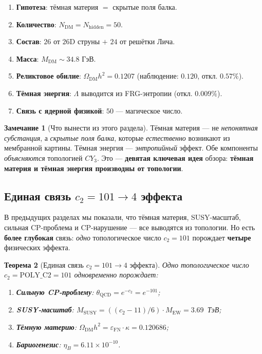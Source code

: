 \documentclass[11pt,a4paper]{article}
\newcommand{\CY}{CY_3}
\newcommand{\Nhidden}{N_{\text{hidden}}}
\newcommand{\epsFN}{\varepsilon_{\text{FN}}}
\newtheorem{theorem}{Теорема}[section]
\theoremstyle{definition}
\newtheorem{remark}[theorem]{Замечание}
\begin{document}
\begin{enumerate}
    \item \textbf{Гипотеза}: тёмная материя $=$ скрытые поля балка.
    \item \textbf{Количество}: $N_{\text{DM}} = \Nhidden = 50$.
    \item \textbf{Состав}: $26$ от $26$D струны $+$ $24$ от 
          решётки Лича.
    \item \textbf{Масса}: $M_{\text{DM}} \sim 34.8$ ГэВ.
    \item \textbf{Реликтовое обилие}: 
          $\Omega_{\text{DM}} h^2 = 0.1207$ (наблюдение: $0.120$, 
          откл. $0.57\%$).
    \item \textbf{Тёмная энергия}: $\Lambda$ выводится из 
          FRG-энтропии (откл. $0.009\%$).
    \item \textbf{Связь с ядерной физикой}: $50$ — магическое 
          число.
\end{enumerate}

\begin{remark}[Что вынести из этого раздела]
\label{rem:dm-takeaway}
Тёмная материя — не \emph{непонятная субстанция}, а 
\emph{скрытые поля балка}, которые \emph{естественно} 
возникают из мембранной картины. Тёмная энергия — 
\emph{энтропийный} эффект. Обе компоненты \emph{объясняются} 
топологией $\CY$. Это — \textbf{девятая ключевая идея} 
обзора: \textbf{тёмная материя и тёмная энергия производны 
от топологии}.
\end{remark}

\subsection{Единая связь \texorpdfstring{$c_2 = 101 \to 4$}{c2 = 101 -> 4} эффекта}
\label{subsec:unified-c2-review}

В предыдущих разделах мы показали, что тёмная материя, 
SUSY-масштаб, сильная CP-проблема и CP-нарушение — все 
выводятся из топологии. Но есть \textbf{более глубокая} 
связь: \emph{одно} топологическое число $c_2 = 101$ порождает 
\textbf{четыре} физических эффекта.

\begin{theorem}[Единая связь $c_2 = 101 \to 4$ эффекта]
\label{thm:unified-c2-review}
Одно топологическое число $c_2 = \text{POLY\_C2} = 101$ 
одновременно порождает:
\begin{enumerate}
    \item \textbf{Сильную CP-проблему}: 
          $\theta_{\text{QCD}} = e^{-c_2} = e^{-101}$;
    \item \textbf{SUSY-масштаб}: 
          $M_{\text{SUSY}} = ((c_2-11)/6) \cdot M_{\text{EW}} = 3.69$~ТэВ;
    \item \textbf{Тёмную материю}: 
          $\Omega_{\text{DM}} h^2 = \epsFN \cdot \kappa = 0.120686$;
    \item \textbf{Бариогенезис}: 
          $\eta_B = 6.11 \times 10^{-10}$.
\end{enumerate}
\end{theorem}
\end{document}
